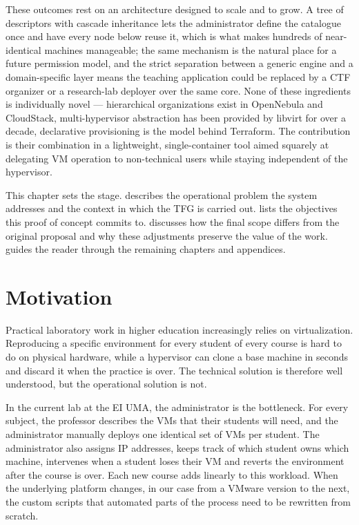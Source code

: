These outcomes rest on an architecture designed to scale and to grow.
A tree of descriptors with cascade inheritance lets the administrator
define the catalogue once and have every node below reuse it, which is
what makes hundreds of near-identical machines manageable; the same
mechanism is the natural place for a future permission model, and the
strict separation between a generic engine and a domain-specific layer
means the teaching application could be replaced by a CTF organizer or
a research-lab deployer over the same core. None of these ingredients
is individually novel --- hierarchical organizations exist in
OpenNebula and CloudStack, multi-hypervisor abstraction has been
provided by libvirt for over a decade, declarative provisioning is the
model behind Terraform. The contribution is their combination in a
lightweight, single-container tool aimed squarely at delegating VM
operation to non-technical users while staying independent of the
hypervisor.

This chapter sets the stage.  describes the
operational problem the system addresses and the context in which the
TFG is carried out.  lists the objectives this
proof of concept commits to.  discusses how the
final scope differs from the original proposal and why these
adjustments preserve the value of the work. 
guides the reader through the remaining chapters and appendices.

\section{Motivation}
\label{sec:motivacion}

Practical laboratory work in higher education increasingly relies on
virtualization. Reproducing a specific environment for every student
of every course is hard to do on physical hardware, while a hypervisor
can clone a base machine in seconds and discard it when the practice
is over. The technical solution is therefore well understood, but the
operational solution is not.

In the current lab at the EI UMA, the administrator is the bottleneck.
For every subject, the professor describes the VMs that their students
will need, and the administrator manually deploys one identical set of
VMs per student. The administrator also assigns IP addresses, keeps
track of which student owns which machine, intervenes when a student
loses their VM and reverts the environment after the course is over.
Each new course adds linearly to this workload. When the underlying
platform changes, in our case from a VMware version to the next, the
custom scripts that automated parts of the process need to be
rewritten from scratch.

